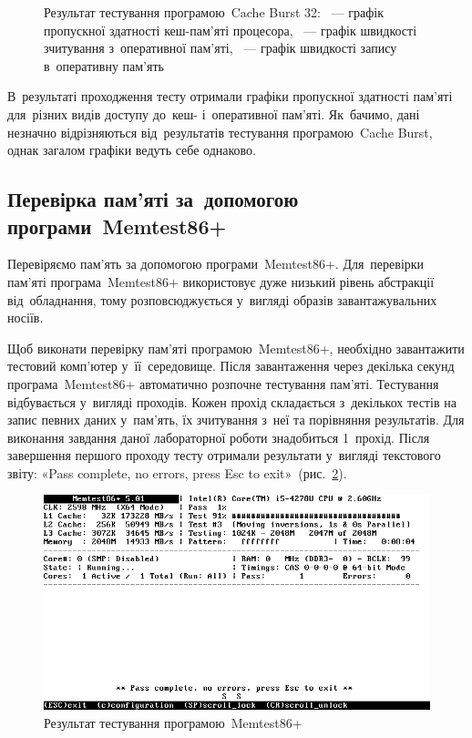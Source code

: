 \documentclass[
	a4paper,
	oneside,
	BCOR = 10mm,
	DIV = 12,
	12pt,
	headings = normal,
]{scrartcl}
\begin{document}
\begin{figure}[!htbp]
\begin{subfigure}[t]{\columnwidth / 3}
					\caption{}
					\label{subfig:membench-test-03}
				\end{subfigure}%
				\caption{Результат тестування програмою~\textenglish{Cache Burst 32}: ~— графік пропускної здатності кеш-пам'\-я\-ті процесора, ~— графік швидкості зчитування з~оперативної пам'\-я\-ті, ~— графік швидкості запису в~оперативну пам'\-ять}
				\label{fig:membench-test}
			\end{figure}

			В~результаті проходження тесту отримали графіки пропускної здатності пам'\-я\-ті для~різних видів доступу до~кеш- і~оперативної пам'\-я\-ті. Як~бачимо, дані незначно відрізняються від~результатів тестування програмою~\textenglish{Cache Burst}, однак загалом графіки ведуть себе однаково. 

		\subsection{Перевірка пам'яті за~допомогою програми~\textenglish{Memtest86+}}
			
			Перевіряємо пам'ять за допомогою програми~\textenglish{Memtest86+}. Для~перевірки пам'\-я\-ті програма~\textenglish{Memtest86+} використовує дуже низький рівень абстракції від~обладнання, тому розповсюджується у~вигляді образів завантажувальних носіїв. 
			
			Щоб виконати перевірку пам'яті програмою~\textenglish{Memtest86+}, необхідно завантажити тестовий комп'ютер у~її~середовище. Після завантаження через декілька секунд програма~\textenglish{Memtest86+} автоматично розпочне тестування пам'яті. Тестування відбувається у~вигляді проходів. Кожен прохід складається з~декількох тестів на запис певних даних у~пам'ять, їх зчитування з~неї та порівняння результатів. Для виконання завдання даної лабораторної роботи знадобиться 1~прохід. Після завершення першого проходу тесту отримали результати у~вигляді текстового звіту: «\textenglish{Pass complete, no errors, press Esc to exit}»~(рис.~\ref{fig:membench-test}). 

			\begin{figure}[!htbp]
				\centering
				\includegraphics[height = 10\baselineskip]{./assets/y03s02-pcdiag-lab-02-p03-01-bw.png}
				\caption{Результат тестування програмою~\textenglish{Memtest86+}}
				\label{fig:memtest86-test}
			\end{figure}
\end{document}
